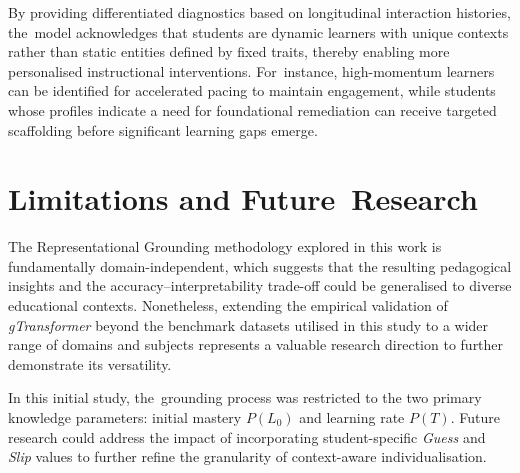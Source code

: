 \documentclass[applsci,article,accept,moreauthors,pdftex]{Definitions/mdpi}
\begin{document}
{By providing differentiated diagnostics based on longitudinal interaction histories, the~model acknowledges that students are dynamic learners with unique contexts rather than static entities defined by fixed traits, thereby enabling more personalised instructional interventions. For~instance, high-momentum learners can be identified for accelerated pacing to maintain engagement, while students whose profiles indicate a need for foundational remediation can receive targeted scaffolding before significant learning gaps emerge.}



\section{Limitations and Future~Research} \label{sec_limitations_future}

{The Representational Grounding methodology explored in this work is fundamentally domain-independent, which suggests that the resulting pedagogical insights and the accuracy--interpretability trade-off could be generalised to diverse educational contexts.} {Nonetheless, extending the empirical validation of \textit{gTransformer} beyond the benchmark datasets utilised in this study to a wider range of domains and subjects represents a valuable research direction to further demonstrate its versatility.}

{In this initial study, the~grounding process was restricted to the two primary knowledge parameters: initial mastery $P(L_0)$ and learning rate $P(T)$.} {Future research could address the impact of incorporating student-specific \textit{Guess} and \textit{Slip} values to further refine the granularity of context-aware individualisation.}
\end{document}
